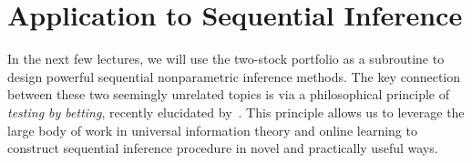 \documentclass[12pt]{article}
\begin{document}
\section{Application to Sequential Inference}
In the next few lectures, we will use the two-stock portfolio as a subroutine to design powerful sequential nonparametric inference methods. The key connection between these two seemingly unrelated topics is via a philosophical principle of \emph{testing by betting}, recently elucidated by~\citet{shafer2021testing}. This principle allows us to leverage the large body of work in universal information theory and online learning to construct sequential inference procedure in novel and practically useful ways. 

\end{document}
